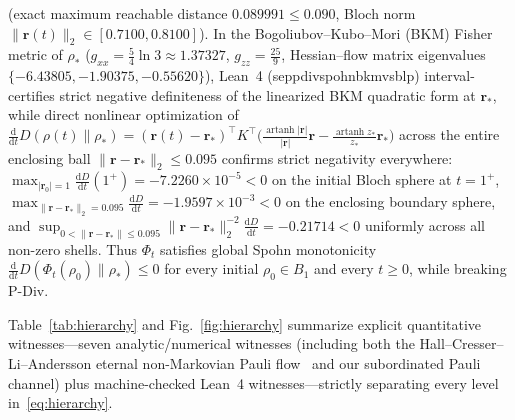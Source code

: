 \documentclass[twocolumn,10pt,amsmath,amssymb,floatfix]{revtex4-2}
\theoremstyle{plain}
\theoremstyle{definition}
\newcommand{\dd}{\mathrm{d}}
\newcommand{\leanid}[1]{{\footnotesize\ttfamily\def\_{\textunderscore\penalty0\hspace{0pt}}#1}}
\begin{document}
(exact maximum reachable distance $0.089991 \le 0.090$, Bloch norm $\|\mathbf{r}(t)\|_2 \in [0.7100, 0.8100]$). In the Bogoliubov--Kubo--Mori (BKM) Fisher metric of $\rho_*$ ($g_{xx} = \frac{5}{4}\ln 3 \approx 1.37327$, $g_{zz} = \frac{25}{9}$, Hessian--flow matrix eigenvalues $\{-6.43805, -1.90375, -0.55620\}$), Lean~4 (\leanid{sep\_pdiv\_spohn\_bkm\_vs\_blp}) interval-certifies strict negative definiteness of the linearized BKM quadratic form at $\mathbf{r}_*$, while direct nonlinear optimization of $\frac{\dd}{\dd t} D(\rho(t)\parallel\rho_*) = (\mathbf{r}(t)-\mathbf{r}_*)^\top K^\top \big(\frac{\operatorname{artanh}|\mathbf{r}|}{|\mathbf{r}|}\mathbf{r} - \frac{\operatorname{artanh} z_*}{z_*}\mathbf{r}_*\big)$ across the entire enclosing ball $\|\mathbf{r} - \mathbf{r}_*\|_2 \le 0.095$ confirms strict negativity everywhere: $\max_{|\mathbf{r}_0|=1} \frac{\dd D}{\dd t}(1^+) = -7.2260 \times 10^{-5} < 0$ on the initial Bloch sphere at $t=1^+$, $\max_{\|\mathbf{r}-\mathbf{r}_*\|_2 = 0.095}\frac{\dd D}{\dd t} = -1.9597 \times 10^{-3} < 0$ on the enclosing boundary sphere, and $\sup_{0<\|\mathbf{r}-\mathbf{r}_*\|\le 0.095}\|\mathbf{r}-\mathbf{r}_*\|_2^{-2}\frac{\dd D}{\dd t} = -0.21714 < 0$ uniformly across all non-zero shells. Thus $\Phi_t$ satisfies global Spohn monotonicity $\frac{\dd}{\dd t}D(\Phi_t(\rho_0)\parallel\rho_*) \le 0$ for every initial $\rho_0 \in B_1$ and every $t \ge 0$, while breaking $\mathrm{P\text{-}Div}$.

Table~\ref{tab:hierarchy} and Fig.~\ref{fig:hierarchy} summarize explicit quantitative witnesses---seven analytic/numerical witnesses (including both the Hall--Cresser--Li--Andersson eternal non-Markovian Pauli flow~\cite{Hall2014PRA,Megier2017SciRep} and our subordinated Pauli channel) plus machine-checked Lean~4 witnesses---strictly separating every level in~\eqref{eq:hierarchy}.
\end{document}
